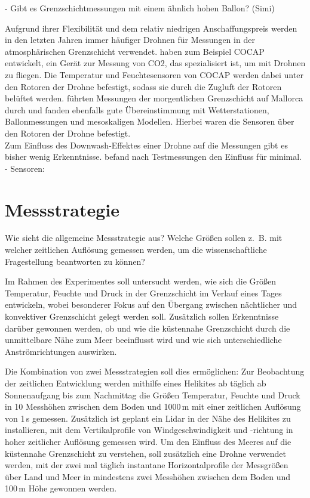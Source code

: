 \documentclass[a4paper,11pt,DIV=calc,tablecaptionabove,headinclude,twoside]{article}
\begin{document}
- Gibt es Grenzschichtmessungen mit einem ähnlich hohen Ballon? (Simi)

Aufgrund ihrer Flexibilität und dem relativ niedrigen Anschaffungspreis werden
in den letzten Jahren immer häufiger Drohnen für Messungen in der atmosphärischen
Grenzschicht verwendet.
\citet{kunz2018cocap} haben zum Beispiel COCAP entwickelt, ein Gerät zur Messung von
CO2, das spezialisiert ist, um mit Drohnen zu fliegen. Die Temperatur und Feuchtesensoren
von COCAP werden dabei unter den Rotoren der Drohne befestigt, sodass sie durch die 
Zugluft der Rotoren belüftet werden. \citet{jimenez2016morning} führten Messungen der morgentlichen Grenzschicht
auf Mallorca durch und fanden ebenfalls gute Übereinstimmung mit Wetterstationen, 
Ballonmessungen und mesoskaligen Modellen. Hierbei waren die Sensoren über den Rotoren
der Drohne befestigt.\\
Zum Einfluss des Downwash-Effektes einer Drohne auf die Messungen gibt es bisher
wenig Erkenntnisse. \citet{zhou2017small} befand nach Testmessungen den Einfluss für
minimal.\\

- Sensoren:





\section{Messstrategie}
Wie sieht die allgemeine Messstrategie aus? Welche Größen sollen z.~B. mit welcher zeitlichen Auflösung gemessen werden, um die wissenschaftliche Fragestellung beantworten zu können?

Im Rahmen des Experimentes soll untersucht werden, wie sich die Größen Temperatur, Feuchte und Druck in der Grenzschicht im Verlauf eines Tages entwickeln, wobei besonderer Fokus auf den Übergang zwischen nächtlicher und konvektiver Grenzschicht gelegt werden soll. Zusätzlich sollen Erkenntnisse darüber gewonnen werden, ob und wie die küstennahe Grenzschicht durch die unmittelbare Nähe zum Meer beeinflusst wird und wie sich unterschiedliche Anströmrichtungen auswirken. 

Die Kombination von zwei Messstrategien soll dies ermöglichen: Zur Beobachtung der zeitlichen Entwicklung werden mithilfe eines Helikites ab täglich ab Sonnenaufgang bis zum Nachmittag die Größen Temperatur, Feuchte und Druck in 10 Messhöhen zwischen dem Boden und 1000\,m mit einer zeitlichen Auflösung von 1\,s gemessen.
Zusätzlich ist geplant ein Lidar in der Nähe des Helikites zu installieren, mit dem Vertikalprofile von Windgeschwindigkeit und -richtung in hoher zeitlicher Auflösung gemessen wird. %
Um den Einfluss des Meeres auf die küstennahe Grenzschicht zu verstehen, soll zusätzlich eine Drohne verwendet werden, mit der zwei mal täglich instantane Horizontalprofile der Messgrößen über Land und Meer in mindestens zwei Messhöhen zwischen dem Boden und 100\,m Höhe gewonnen werden. 
\end{document}
